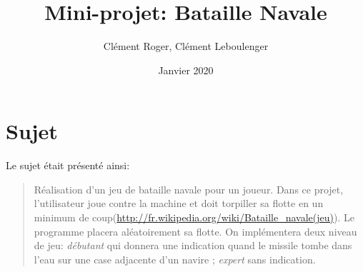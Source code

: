 \documentclass[french]{article}
\title{Mini-projet: Bataille Navale}
\author{Clément Roger, Clément Leboulenger}
\date{Janvier 2020}
\begin{document}
\maketitle

\newpage
\tableofcontents

\newpage
{}

\section{Sujet}
Le sujet était présenté ainsi:
\begin{quotation}
	Réalisation d'un jeu de bataille navale pour un joueur. Dans ce projet, l'utilisateur joue contre la machine et doit torpiller sa flotte en un minimum de coup(\url{http://fr.wikipedia.org/wiki/Bataille_navale(jeu)}). Le programme placera aléatoirement sa flotte. On implémentera deux niveau de jeu: \emph{débutant} qui donnera une indication quand le missile tombe dans l'eau sur une case adjacente d'un navire ; \emph{expert} sans indication.	
\end{quotation}
\end{document}
